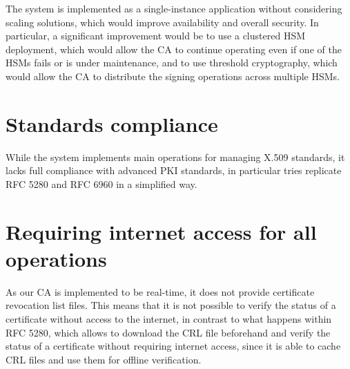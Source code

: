 The system is implemented as a single-instance application without considering scaling solutions, which
would improve availability and overall security. In particular, a significant improvement would be
to use a clustered HSM deployment, which would allow the CA to continue operating even if one of the HSMs
fails or is under maintenance, and to use threshold cryptography, which would allow the CA to distribute
the signing operations across multiple HSMs.

\section{Standards compliance}

While the system implements main operations for managing X.509 standards, it lacks full compliance 
with advanced PKI standards, in particular tries replicate RFC 5280 and RFC 6960 in a simplified way.

\section{Requiring internet access for all operations}
As our CA is implemented to be real-time, it does not provide certificate revocation list files. This means 
that it is not possible to verify the status of a certificate without access to the internet, in contrast 
to what happens within RFC 5280, which allows to download the CRL file beforehand and verify the status 
of a certificate without requiring internet access, since it is able to cache CRL files and use them for 
offline verification.